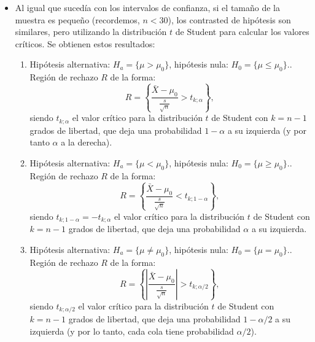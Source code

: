        \begin{itemize}


       \item Al igual que sucedía con los intervalos de confianza, si el tamaño de la muestra es pequeño (recordemos, $n<30$), los contrasted de hipótesis son similares, pero utilizando la distribución $t$ de Student para calcular los valores críticos. Se obtienen estos resultados:
        \begin{enumerate}
        \item Hipótesis alternativa: $H_a=\{\mu>\mu_0\}$, hipótesis nula: $H_0=\{\mu\leq \mu_0\}.$.\\[3mm]
            Región de rechazo $R$ de la forma:
            \[R=\left\{\dfrac{\bar X-\mu_0}{\frac{s}{\sqrt{n}}}>t_{k;\alpha}\right\},\]
            siendo $t_{k;\alpha}$ el valor crítico para la distribución $t$ de Student con $k=n-1$ grados de libertad, que deja una probabilidad $1-\alpha$ a su izquierda (y por tanto $\alpha$ a la derecha).


    \item Hipótesis alternativa: $H_a=\{\mu<\mu_0\}$, hipótesis nula: $H_0=\{\mu\geq \mu_0\}.$.\\[3mm]
            Región de rechazo $R$ de la forma:
            \[R=\left\{\dfrac{\bar X-\mu_0}{\frac{s}{\sqrt{n}}}<t_{k;1-\alpha}\right\},\]
            siendo $t_{k;1-\alpha}=-t_{k;\alpha}$ el valor crítico para la distribución $t$ de Student con $k=n-1$ grados de libertad, que deja una probabilidad $\alpha$ a su izquierda.



    \item Hipótesis alternativa: $H_a=\{\mu\neq\mu_0\}$, hipótesis nula: $H_0=\{\mu=\mu_0\}.$.\\[3mm]
            Región de rechazo $R$ de la forma:
        \[R=\left\{\left|\dfrac{\bar X-\mu_0}{\frac{s}{\sqrt{n}}}\right|>t_{k;\alpha/2}\right\},\]
        siendo $t_{k;\alpha/2}$ el valor crítico para la distribución $t$ de Student con $k=n-1$ grados de libertad, que deja una probabilidad $1-\alpha/2$ a su izquierda (y por lo tanto, cada cola tiene probabilidad $\alpha/2$).

    \end{enumerate}

       \end{itemize}

